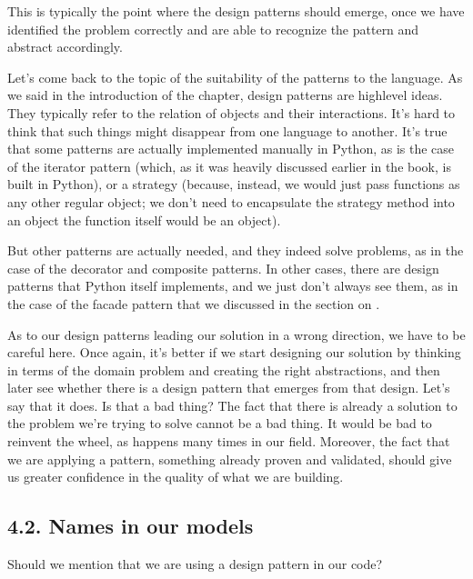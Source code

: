 \documentclass[a4paper,10pt,english]{sphinxmanual}
\begin{document}
This is typically the point where the design patterns should emerge, once we have
identified the problem correctly and are able to recognize the pattern and abstract
accordingly.

Let’s come back to the topic of the suitability of the patterns to the language. As we said in
the introduction of the chapter, design patterns are high\sphinxhyphen{}level ideas. They typically refer to
the relation of objects and their interactions. It’s hard to think that such things might
disappear from one language to another. It’s true that some patterns are actually
implemented manually in Python, as is the case of the iterator pattern (which, as it was
heavily discussed earlier in the book, is built in Python), or a strategy (because, instead, we
would just pass functions as any other regular object; we don’t need to encapsulate the
strategy method into an object the function itself would be an object).

But other patterns are actually needed, and they indeed solve problems, as in the case of the
decorator and composite patterns. In other cases, there are design patterns that Python
itself implements, and we just don’t always see them, as in the case of the facade pattern
that we discussed in the section on .

As to our design patterns leading our solution in a wrong direction, we have to be careful
here. Once again, it’s better if we start designing our solution by thinking in terms of the
domain problem and creating the right abstractions, and then later see whether there is a
design pattern that emerges from that design. Let’s say that it does. Is that a bad thing? The
fact that there is already a solution to the problem we’re trying to solve cannot be a bad
thing. It would be bad to reinvent the wheel, as happens many times in our field. Moreover,
the fact that we are applying a pattern, something already proven and validated, should
give us greater confidence in the quality of what we are building.


\subsection{4.2. Names in our models}
\label{\detokenize{chapters/9_design_patterns/index:names-in-our-models}}
Should we mention that we are using a design pattern in our code?
\end{document}
